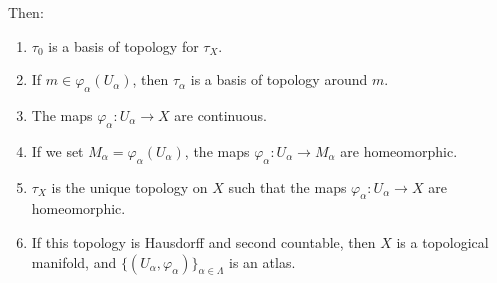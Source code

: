\begin{theorem}
	Then:
	\begin{enumerate}
		\item		\label{ITEMooLNAPooIZVFVZ}
		      \( \tau_0\) is a basis of topology for \( \tau_X\).
		\item		\label{ITEMooRSZOooFfNrCQ}
		      If \( m\in\varphi_{\alpha}(U_{\alpha})\), then \( \tau_{\alpha}\) is a basis of topology around \( m\).
		      \item\label{ITEMooXGDRooRWiVnF}
		      The maps \(\varphi_{\alpha} \colon U_{\alpha}\to X  \) are continuous.
		\item \label{ITEMooPPZIooViYPck}
		      If we set \( M_{\alpha}=\varphi_{\alpha}(U_{\alpha})\), the maps \(\varphi_{\alpha} \colon U_{\alpha}\to M_{\alpha} \) are homeomorphic.
		\item		\label{ITEMooCMUKooBvlXbs}
		      \( \tau_X\) is the unique topology on \( X\) such that the maps \(\varphi_{\alpha} \colon U_{\alpha} \to X  \) are homeomorphic.
		\item	\label{ITEMooAZHPooWzAjlS}
		      If this topology is Hausdorff and second countable, then \( X\) is a topological manifold, and \( \{ (U_{\alpha}, \varphi_{\alpha}) \}_{\alpha\in\Lambda}\) is an atlas.
	\end{enumerate}
\end{theorem}


